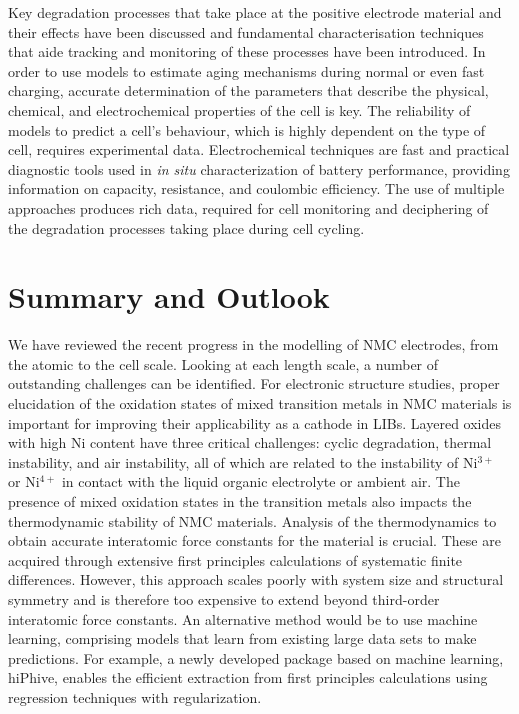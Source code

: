 \documentclass[journal=jacsat,manuscript=article]{achemso}
\begin{document}
Key degradation processes that take place at the positive electrode material and their effects have been discussed and fundamental characterisation techniques that aide tracking and monitoring of these processes have been introduced.
In order to use models to estimate aging mechanisms during normal or even fast charging, accurate determination of the parameters that describe the physical, chemical, and electrochemical properties of the cell is key.
The reliability of models to predict a cell's behaviour, which is highly dependent on the type of cell, requires experimental data.
Electrochemical techniques are fast and practical diagnostic tools used in \textit{in situ} characterization of battery performance, providing information on capacity, resistance, and coulombic efficiency.
The use of multiple approaches produces rich data, required for cell monitoring and deciphering of the degradation processes taking place during cell cycling.

\section*{Summary and Outlook}
We have reviewed the recent progress in the modelling of NMC electrodes, from the atomic to the cell scale.
Looking at each length scale, a number of outstanding challenges can be identified.
For electronic structure studies, proper elucidation of the oxidation states of mixed transition metals in NMC materials is important for improving their applicability as a cathode in LIBs.
Layered oxides with high Ni content have three critical challenges: cyclic degradation, thermal instability, and air instability, all of which are related to the instability of Ni$^{3+}$ or Ni$^{4+}$ in contact with the liquid organic electrolyte or ambient air.\cite{Manthiram-NatComm-2020}
The presence of mixed oxidation states in the transition metals also impacts the thermodynamic stability of NMC materials.
Analysis of the thermodynamics to obtain accurate interatomic force constants for the material is crucial.
These are acquired through extensive first principles calculations of systematic finite differences.
However, this approach scales poorly with system size and structural symmetry and is therefore too expensive to extend beyond third-order interatomic force constants.
An alternative method would be to use machine learning, comprising models that learn from existing large data sets to make predictions.
For example, a newly developed package based on machine learning, hiPhive, enables the efficient extraction from first principles calculations using regression techniques with regularization.\cite{eriksson2019hiphive}
\end{document}
